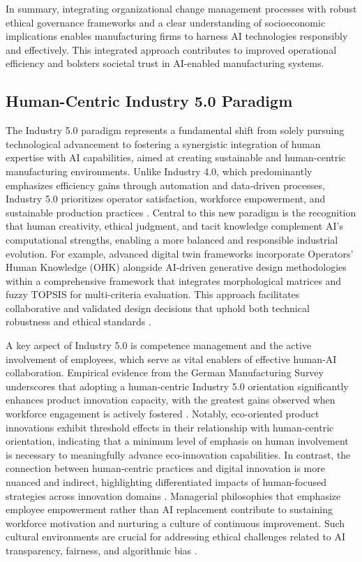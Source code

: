 \documentclass[sigconf]{acmart}
\begin{document}
In summary, integrating organizational change management processes with robust ethical governance frameworks and a clear understanding of socioeconomic implications enables manufacturing firms to harness AI technologies responsibly and effectively. This integrated approach contributes to improved operational efficiency and bolsters societal trust in AI-enabled manufacturing systems.

\subsection{Human-Centric Industry 5.0 Paradigm}

The Industry 5.0 paradigm represents a fundamental shift from solely pursuing technological advancement to fostering a synergistic integration of human expertise with AI capabilities, aimed at creating sustainable and human-centric manufacturing environments. Unlike Industry 4.0, which predominantly emphasizes efficiency gains through automation and data-driven processes, Industry 5.0 prioritizes operator satisfaction, workforce empowerment, and sustainable production practices \cite{ref2}. Central to this new paradigm is the recognition that human creativity, ethical judgment, and tacit knowledge complement AI’s computational strengths, enabling a more balanced and responsible industrial evolution. For example, advanced digital twin frameworks incorporate Operators’ Human Knowledge (OHK) alongside AI-driven generative design methodologies within a comprehensive framework that integrates morphological matrices and fuzzy TOPSIS for multi-criteria evaluation. This approach facilitates collaborative and validated design decisions that uphold both technical robustness and ethical standards \cite{ref2,ref14}.

A key aspect of Industry 5.0 is competence management and the active involvement of employees, which serve as vital enablers of effective human-AI collaboration. Empirical evidence from the German Manufacturing Survey underscores that adopting a human-centric Industry 5.0 orientation significantly enhances product innovation capacity, with the greatest gains observed when workforce engagement is actively fostered \cite{ref14}. Notably, eco-oriented product innovations exhibit threshold effects in their relationship with human-centric orientation, indicating that a minimum level of emphasis on human involvement is necessary to meaningfully advance eco-innovation capabilities. In contrast, the connection between human-centric practices and digital innovation is more nuanced and indirect, highlighting differentiated impacts of human-focused strategies across innovation domains \cite{ref14}. Managerial philosophies that emphasize employee empowerment rather than AI replacement contribute to sustaining workforce motivation and nurturing a culture of continuous improvement. Such cultural environments are crucial for addressing ethical challenges related to AI transparency, fairness, and algorithmic bias \cite{ref9,ref15,ref36}.
\end{document}
